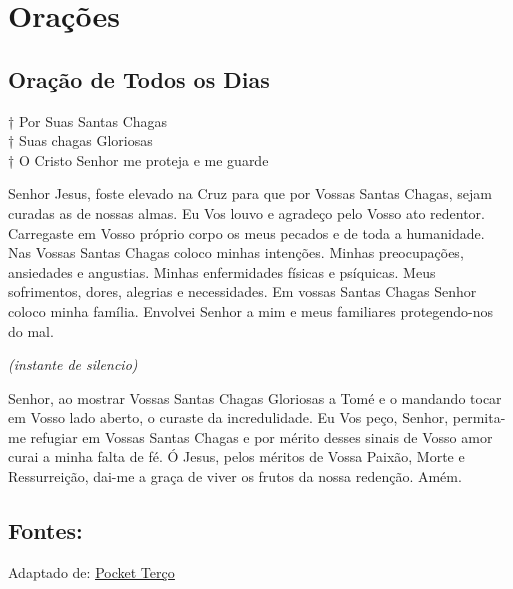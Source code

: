 \documentclass[a4paper,14pt]{extarticle} \usepackage[utf8]{inputenc}
\begin{document}
\vfill

\section{Orações}
\subsection{Oração de Todos os Dias}\label{sub:inicial} %

{
	\noindent
	† Por Suas Santas Chagas\\
	† Suas chagas Gloriosas\\
	† O Cristo Senhor me proteja e me guarde\\
}

Senhor Jesus, foste elevado na Cruz para que por Vossas Santas Chagas, sejam curadas as de nossas almas. Eu Vos louvo e agradeço pelo Vosso ato redentor. Carregaste em Vosso próprio corpo os meus pecados e de toda a humanidade. Nas Vossas Santas Chagas coloco minhas intenções. Minhas preocupações, ansiedades e angustias. Minhas enfermidades físicas e psíquicas. Meus sofrimentos, dores, alegrias e necessidades. Em vossas Santas Chagas Senhor coloco minha família. Envolvei Senhor a mim e meus familiares protegendo-nos do mal.

\textit{(instante de silencio)}

Senhor, ao mostrar Vossas Santas Chagas Gloriosas a Tomé e o mandando tocar em Vosso lado aberto, o curaste da incredulidade. Eu Vos peço, Senhor, permita-me refugiar em Vossas Santas Chagas e por mérito desses sinais de Vosso amor curai a minha falta de fé. Ó Jesus, pelos méritos de Vossa Paixão, Morte e Ressurreição, dai-me a graça de viver os frutos da nossa redenção.
Amém.

\vfill

\begin{center}
	\subsection*{Fontes:}
	Adaptado de: {\color{blue} \underline{\href{https://pocketterco.com.br/terco/novena-das-santas-chagas}{Pocket Terço}}}

\end{center}
\end{document}
